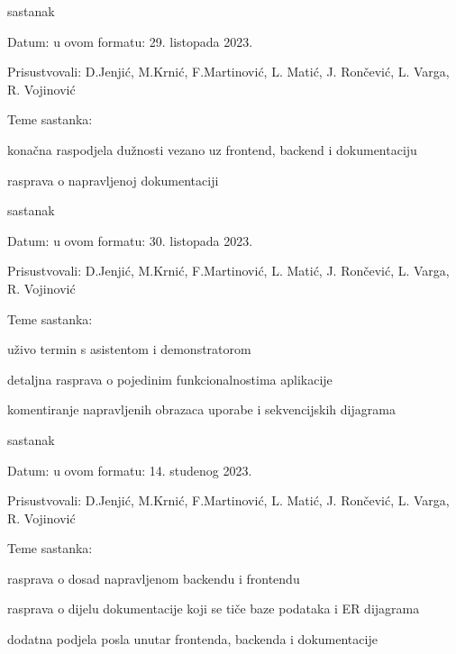 \begin{packed_enum}
			\item  sastanak
			\item[] \begin{packed_item}
				\item Datum: u ovom formatu: 29. listopada 2023.
				\item Prisustvovali: D.Jenjić, M.Krnić, F.Martinović, L. Matić, J. Rončević, L. Varga, R. Vojinović
				\item Teme sastanka:
				\begin{packed_item}
					\item  konačna raspodjela dužnosti vezano uz frontend, backend i dokumentaciju
					\item  rasprava o napravljenoj dokumentaciji
				\end{packed_item}
			\end{packed_item}
			
			\vspace{1cm}
			
			\item  sastanak
			\item[] \begin{packed_item}
				\item Datum: u ovom formatu: 30. listopada 2023.
				\item Prisustvovali: D.Jenjić, M.Krnić, F.Martinović, L. Matić, J. Rončević, L. Varga, R. Vojinović
				\item Teme sastanka:
				\begin{packed_item}
					\item  uživo termin s asistentom i demonstratorom
					\item  detaljna rasprava o pojedinim funkcionalnostima aplikacije
					\item  komentiranje napravljenih obrazaca uporabe i sekvencijskih dijagrama
				\end{packed_item}
			\end{packed_item}
			
			\item  sastanak
			\item[] \begin{packed_item}
				\item Datum: u ovom formatu: 14. studenog 2023.
				\item Prisustvovali: D.Jenjić, M.Krnić, F.Martinović, L. Matić, J. Rončević, L. Varga, R. Vojinović
				\item Teme sastanka:
				\begin{packed_item}
					\item  rasprava o dosad napravljenom backendu i frontendu
					\item  rasprava o dijelu dokumentacije koji se tiče baze podataka i ER dijagrama
					\item  dodatna podjela posla unutar frontenda, backenda i dokumentacije
				\end{packed_item}
			\end{packed_item}
			

\end{packed_enum}
